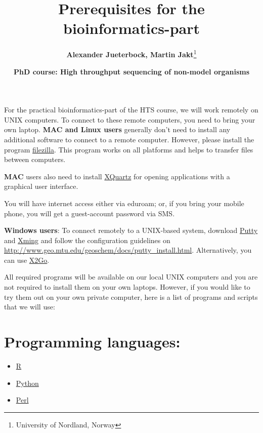 \documentclass[11pt]{article}
\author{\textbf{Alexander Jueterbock, Martin Jakt}\thanks{University of Nordland, Norway}}
\date{\textbf{PhD course: High throughput sequencing of non-model organisms}}
\title{\textbf{Prerequisites for the bioinformatics-part}}
\begin{document}
\maketitle







For the practical bioinformatics-part of the HTS course, we will work
remotely on UNIX computers. To connect to these remote computers, you
need to bring your own laptop. \textbf{MAC and Linux users} generally don't
need to install any additional software to connect to a remote
computer. However, please install the program \href{https://filezilla-project.org}{filezilla}. This program
works on all platforms and helps to transfer files between
computers. 

\textbf{MAC} users also need to install \href{http://xquartz.macosforge.org/landing/}{XQuartz} for opening applications with
a graphical user interface.

You will have internet access either via eduroam; or, if you bring
your mobile phone, you will get a guest-account password via SMS.

\textbf{Windows users}: To connect remotely to a UNIX-based system, download
\href{http://www.chiark.greenend.org.uk/~sgtatham/putty/download.html}{Putty} and \href{http://sourceforge.net/projects/xming/}{Xming} and follow the configuration guidelines on
\url{http://www.geo.mtu.edu/geoschem/docs/putty_install.html}.
Alternatively, you can use \href{http://wiki.x2go.org/doku.php/start}{X2Go}.


All required programs will be available on our local UNIX computers
and you are not required to install them on your own laptops. However,
if you would like to try them out on your own private computer, here
is a list of programs and scripts that we will use:

\section*{Programming languages:}
\label{unnumbered-1}
\begin{itemize}
\item \href{http://cran.r-project.org/}{R}
\item \href{https://www.python.org/}{Python}
\item \href{https://www.perl.org/}{Perl}
\end{itemize}
\end{document}
